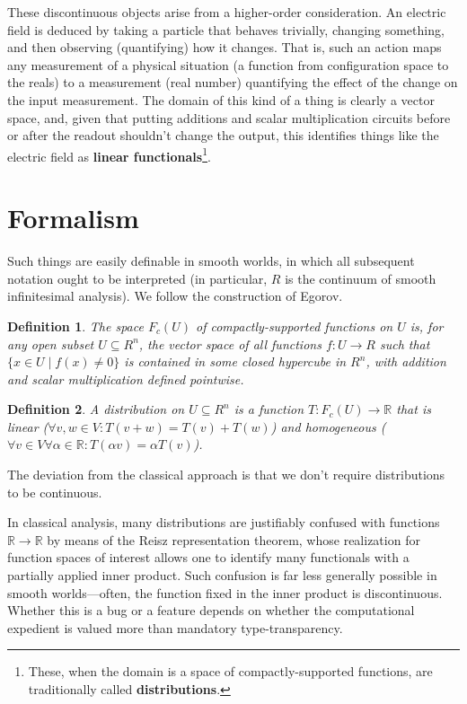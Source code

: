 \documentclass{article}
\newtheorem{definition}{Definition}
\begin{document}
These discontinuous objects arise from a higher-order consideration.
An electric field is deduced by taking a particle that behaves trivially, changing something, and then observing (quantifying) how it changes.
That is, such an action maps any measurement of a physical situation (a function from configuration space to the reals)
to a measurement (real number) quantifying the effect of the change on the input measurement.
The domain of this kind of a thing is clearly a vector space, and, given that putting additions and scalar multiplication circuits before or after
the readout shouldn't change the output, this identifies things like the electric field as
\textbf{linear functionals}\footnote
{
  These, when the domain is a space of compactly-supported functions, are traditionally called \textbf{distributions}.
}.

\section{Formalism}

Such things are easily definable in smooth worlds, in which all subsequent notation ought to be interpreted (in particular,
$R$ is the continuum of smooth infinitesimal analysis).
We follow the construction of Egorov.

\begin{definition}
  The space $F_{c}(U)$ of compactly-supported functions on $U$ is, for any open subset $U \subseteq R^{n}$,
  the vector space of all functions $f: U \to R$ such that $\{x \in U \mid f(x) \neq 0\}$ is contained in some closed hypercube in $R^{n}$,
  with addition and scalar multiplication defined pointwise.
\end{definition}

\begin{definition}
  A distribution on $U \subseteq R^{n}$ is a function $T: F_{c}(U) \to \mathbb{R}$
  that is linear ($\forall v, w \in V: T(v + w) = T(v) + T(w)$)
  and homogeneous ($\forall v \in V \forall \alpha \in \mathbb{R}: T(\alpha v) = \alpha T(v)$).
\end{definition}

The deviation from the classical approach is that we don't require distributions to be continuous.

In classical analysis, many distributions are justifiably confused with functions $\mathbb{R} \to \mathbb{R}$
by means of the Reisz representation theorem,
whose realization for function spaces of interest allows one to identify many functionals with a partially applied inner product.
Such confusion is far less generally possible in smooth worlds---often, the function fixed in the inner product is discontinuous.
Whether this is a bug or a feature depends on whether the computational expedient is valued more than mandatory type-transparency.
\end{document}
